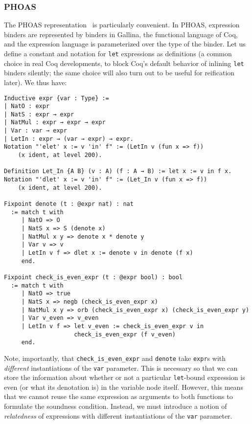 \subsubsection{PHOAS} \label{sec:binders:PHOAS}

The PHOAS representation~\cite{PhoasICFP08,weak2013Ciaffaglione} is particularly convenient.
In PHOAS, expression binders are represented by binders in Gallina, the functional language of Coq, and the expression language is parameterized over the type of the binder.
Let us define a constant and notation for \texttt{let} expressions as definitions (a common choice in real Coq developments, to block Coq's default behavior of inlining \texttt{let} binders silently; the same choice will also turn out to be useful for reification later).
We thus have: \label{sec:phoas-expr-def}
\begin{verbatim}
Inductive expr {var : Type} :=
| NatO : expr
| NatS : expr → expr
| NatMul : expr → expr → expr
| Var : var → expr
| LetIn : expr → (var → expr) → expr.
Notation "'elet' x := v 'in' f" := (LetIn v (fun x => f))
    (x ident, at level 200).

Definition Let_In {A B} (v : A) (f : A → B) := let x := v in f x.
Notation "'dlet' x := v 'in' f" := (Let_In v (fun x => f))
    (x ident, at level 200).

Fixpoint denote (t : @expr nat) : nat
  := match t with
     | NatO => O
     | NatS x => S (denote x)
     | NatMul x y => denote x * denote y
     | Var v => v
     | LetIn v f => dlet x := denote v in denote (f x)
     end.

Fixpoint check_is_even_expr (t : @expr bool) : bool
  := match t with
     | NatO => true
     | NatS x => negb (check_is_even_expr x)
     | NatMul x y => orb (check_is_even_expr x) (check_is_even_expr y)
     | Var v_even => v_even
     | LetIn v f => let v_even := check_is_even_expr v in
                    check_is_even_expr (f v_even)
     end.
\end{verbatim}


Note, importantly, that \texttt{check_is_even_expr} and \texttt{denote} take \texttt{expr}s with \emph{different} instantiations of the \texttt{var} parameter.
This is necessary so that we can store the information about whether or not a particular \texttt{let}-bound expression is even (or what its denotation is) in the variable node itself.
However, this means that we cannot reuse the same expression as arguments to both functions to formulate the soundness condition.
Instead, we must introduce a notion of \emph{relatedness} of expressions with different instantiations of the \texttt{var} parameter.

